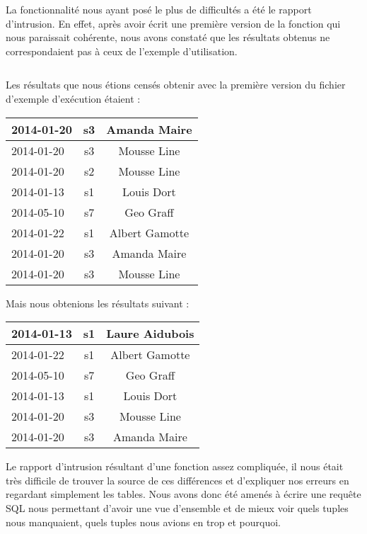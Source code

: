La fonctionnalité nous ayant posé le plus de difficultés a été le rapport d'intrusion. En effet, après avoir écrit une première version de la fonction  qui nous paraissait cohérente, nous avons constaté que les résultats obtenus ne correspondaient pas à ceux de l'exemple d'utilisation. \\

\inputminted[tabsize=4,linenos,fontsize=\small]{sql}{code/1.sql}

Les résultats que nous étions censés obtenir avec la première version du fichier d'exemple d'exécution étaient :
\begin{center}
	\begin{tabular}
		{| l |	c |	c |} \hline
		2014-01-20 & s3 & Amanda Maire \\ \hline
		2014-01-20 & s3 & Mousse Line \\ \hline
		2014-01-20 & s2 & Mousse Line \\ \hline
		2014-01-13 & s1 & Louis Dort \\ \hline
		2014-05-10 & s7 & Geo Graff \\ \hline
		2014-01-22 & s1 & Albert Gamotte \\ \hline
		2014-01-20 & s3 & Amanda Maire \\ \hline
		2014-01-20 & s3 & Mousse Line \\ \hline
	\end{tabular}
\end{center}

Mais nous obtenions les résultats suivant :
\begin{center}
	\begin{tabular}
		{| l |	c |	c |} \hline
		2014-01-13 & s1 & Laure Aidubois \\ \hline
		2014-01-22 & s1 & Albert Gamotte \\ \hline
		2014-05-10 & s7 & Geo Graff \\ \hline
		2014-01-13 & s1 & Louis Dort \\ \hline
		2014-01-20 & s3 & Mousse Line \\ \hline
		2014-01-20 & s3 & Amanda Maire \\ \hline
	\end{tabular}
\end{center}



Le rapport d'intrusion résultant d'une fonction assez compliquée, il nous était très difficile de trouver la source de ces différences et d'expliquer nos erreurs en regardant simplement les tables. Nous avons donc été amenés à écrire une requête SQL nous permettant d'avoir une vue d'ensemble et de mieux voir quels tuples nous manquaient, quels tuples nous avions en trop et pourquoi.\\

